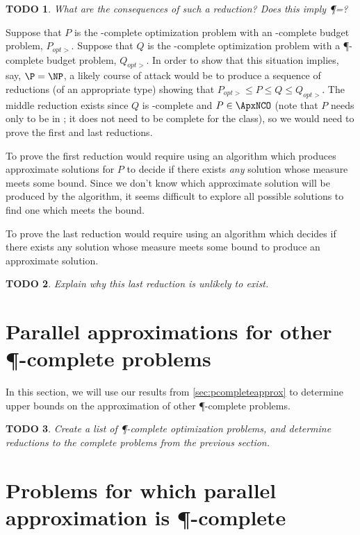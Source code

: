 \documentclass[]{article}
\theoremstyle{plain}
\newtheorem{todo}{TODO}
\theoremstyle{definition}
\begin{document}
\begin{todo}
  What are the consequences of such a reduction?
  Does this imply \P=\NP?
\end{todo}

Suppose that $P$ is the \ApxNCO-complete optimization problem with an \NP-complete budget problem, $P_{opt>}$.
Suppose that $Q$ is the \ApxNCO-complete optimization problem with a \P-complete budget problem, $Q_{opt>}$.
In order to show that this situation implies, say, $\P=\NP$, a likely course of attack would be to produce a sequence of reductions (of an appropriate type) showing that $P_{opt>} \leq P \leq Q \leq Q_{opt>}$.
The middle reduction exists since $Q$ is \ApxNCO-complete and $P\in\ApxNCO$ (note that $P$ needs only to be in \ApxNCO; it does not need to be complete for the class), so we would need to prove the first and last reductions.

To prove the first reduction would require using an algorithm which produces approximate solutions for $P$ to decide if there exists \emph{any} solution whose measure meets some bound.
Since we don't know which approximate solution will be produced by the algorithm, it seems difficult to explore all possible solutions to find one which meets the bound.

To prove the last reduction would require using an algorithm which decides if there exists any solution whose measure meets some bound to produce an approximate solution.

\begin{todo}
  Explain why this last reduction is unlikely to exist.
\end{todo}

\section{Parallel approximations for other \texorpdfstring{\P}{P}-complete problems}

In this section, we will use our results from \autoref{sec:pcompleteapprox} to determine upper bounds on the approximation of other \P-complete problems.

\begin{todo}
  Create a list of \P-complete optimization problems, and determine reductions to the complete problems from the previous section.
\end{todo}

\section{Problems for which parallel approximation is \texorpdfstring{\P}{P}-complete}
\label{sec:approximationispcomplete}
\end{document}

